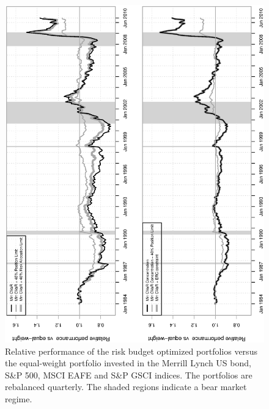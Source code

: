 \documentclass[11pt]{article}
\begin{document}
\begin{figure}[tb]
\caption{Relative performance of the risk budget optimized portfolios versus the equal-weight portfolio invested in the Merrill Lynch US bond, S\&P 500, MSCI EAFE and S\&P GSCI indices. The portfolios are rebalanced quarterly. The shaded regions indicate a bear market regime.  }
\includegraphics[width=12cm,angle=270]{RelPerf_EW.eps}
\end{figure}

\newpage
\end{document}
